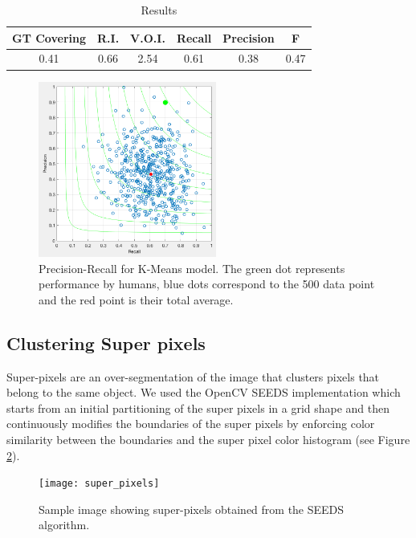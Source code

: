 \documentclass[10pt, twocolumn, twoside]{article}
\newcommand{\squeezeup}{\vspace{-2.5mm}}
\begin{document}
\begin{table}[ht]
\caption{Results} %
\centering %
\begin{tabular}{c c c c c c} %
\hline\hline %
GT Covering & R.I. & V.O.I. & Recall & Precision & F \\ [0.5ex] %
\hline %
 0.41 & 0.66 & 2.54 & 0.61 & 0.38 & 0.47 \\ 
\hline %
\end{tabular}
\label{table:table_k} %
\end{table}

\begin{figure}[h]
	\centering
	\includegraphics[width=2.3in]{images/F-kmeans.png}
    \caption{Precision-Recall for K-Means model. The green dot represents performance by humans, blue dots correspond to the 500 data point and the red point is their total average.}
    \label{fig:F-kmeans}
\end{figure}

\subsection{Clustering Super pixels}
\squeezeup
Super-pixels are an over-segmentation of the image that clusters pixels that belong to the same object. We used the OpenCV SEEDS \cite{Bergh} implementation which starts from an initial partitioning of the super pixels in a grid shape and then continuously modifies the boundaries of the super pixels
by enforcing color similarity between the boundaries and the super pixel color histogram (see Figure \ref{fig:superpixels}).

\begin{figure}[ht]
	\centering
	\texttt{[image: super\_pixels]}
    \caption{Sample image showing super-pixels obtained from the SEEDS algorithm.}
    \label{fig:superpixels}
\end{figure}
\end{document}
